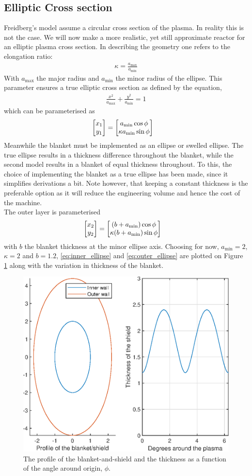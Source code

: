 \subsection{Elliptic Cross section}
Freidberg's model assume a circular cross section of the plasma. In reality this is not the case. We will now make a more realistic, yet still approximate reactor for an elliptic plasma cross section.
In describing the geometry one refers to the elongation ratio:
\begin{align}
	\kappa = \frac{a_{\max}}{a_{\min}}
\end{align}
With $a_{\max}$ the major radius and $a_{\min}$ the minor radius of the ellipse. This parameter ensures a true elliptic cross section as defined by the equation,
\begin{align}
	\frac{x^2}{a_{\max}}+\frac{y^2}{a_{\min}} = 1
\end{align}
which can be parameterised as
\begin{align}
	\mqty[x_1 \\y_1] &= \mqty[a_{\min}\cos{\phi}\\\kappa a_{\min}\sin{\phi}]
	\label{eq:inner_ellipse}
\end{align}
Meanwhile the blanket must be implemented as an ellipse or swelled ellipse. The true ellipse results in a thickness difference throughout the blanket, while the second model results in a blanket of equal thickness throughout. To this, the choice of implementing the blanket as a true ellipse has been made, since it simplifies derivations a bit. Note however, that keeping a constant thickness is the preferable option as it will reduce the engineering volume and hence the cost of the machine.\\
The outer layer is parameterised
\begin{align}
	\mqty[x_2 \\y_2] &= \mqty[\pqty{b+a_{\min}}\cos{\phi}\\\kappa \pqty{b+a_{\min}}\sin{\phi}]
	\label{eq:outer_ellipse}
\end{align}
with $b$ the blanket thickness at the minor ellipse axis. Choosing for now, $a_{\min}=2$, $\kappa=2$ and $b=1.2$, \cref{eq:inner_ellipse} and \cref{eq:outer_ellipse} are plotted on Figure \cref{ShTh} along with the variation in thickness of the blanket.\newline
\begin{figure}
	\vspace{-5mm}
	\includegraphics[width=.4\textwidth]{MatlabFigures/ShieldThickness/ShieldThickness.eps}
	\caption{The profile of the blanket-and-shield and the thickness as a function of the angle around origin, \(\phi\).}
	\label{ShTh}
\end{figure}
